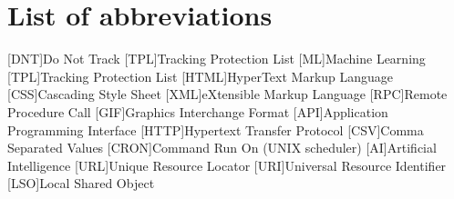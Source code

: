 \documentclass[oneside,12pt,titlepage,ngerman,a4paper,bibliography=totocnumbered,listof=numbered]{scrbook}
\begin{document}

\frontmatter



% 

\tableofcontents{}
\listoffigures{}
\listoftables
\chapter{List of abbreviations}
\begin{acronym}[eugh]
[DNT]{Do Not Track} [TPL]{Tracking Protection List}
[ML]{Machine Learning}
[TPL]{Tracking Protection List}
[HTML]{HyperText Markup Language}
[CSS]{Cascading Style Sheet}
[XML]{eXtensible Markup Language}
[RPC]{Remote Procedure Call}
[GIF]{Graphics Interchange Format}
[API]{Application Programming Interface}
[HTTP]{Hypertext Transfer Protocol}
[CSV]{Comma Separated Values}
[CRON]{Command Run On (UNIX scheduler)}
[AI]{Artificial Intelligence}
[URL]{Unique Resource Locator}
[URI]{Universal Resource Identifier}
[LSO]{Local Shared Object}
\end{acronym}
\mainmatter









\backmatter

\end{document}
